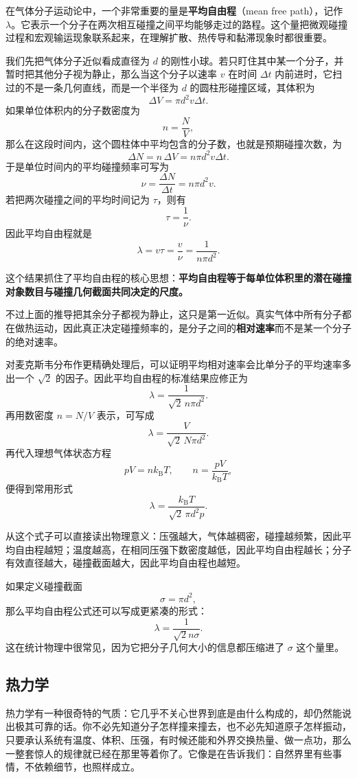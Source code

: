 \documentclass[UTF8]{ctexbook}
\begin{document}
在气体分子运动论中，一个非常重要的量是\textbf{平均自由程}（mean free path），记作 \(\lambda\)。它表示一个分子在两次相互碰撞之间平均能够走过的路程。这个量把微观碰撞过程和宏观输运现象联系起来，在理解扩散、热传导和黏滞现象时都很重要。


我们先把气体分子近似看成直径为 \(d\) 的刚性小球。若只盯住其中某一个分子，并暂时把其他分子视为静止，那么当这个分子以速率 \(v\) 在时间 \(\Delta t\) 内前进时，它扫过的不是一条几何直线，而是一个半径为 \(d\) 的圆柱形碰撞区域，其体积为
\[
\Delta V=\pi d^2 v\Delta t.
\]
如果单位体积内的分子数密度为
\[
n=\frac{N}{V},
\]
那么在这段时间内，这个圆柱体中平均包含的分子数，也就是预期碰撞次数，为
\[
\Delta N=n\,\Delta V=n\pi d^2 v\Delta t.
\]
于是单位时间内的平均碰撞频率可写为
\[
\nu=\frac{\Delta N}{\Delta t}=n\pi d^2 v.
\]
若把两次碰撞之间的平均时间记为 \(\tau\)，则有
\[
\tau=\frac{1}{\nu}.
\]
因此平均自由程就是
\[
\lambda=v\tau=\frac{v}{\nu}=\frac{1}{n\pi d^2}.
\]

这个结果抓住了平均自由程的核心思想：\textbf{平均自由程等于每单位体积里的潜在碰撞对象数目与碰撞几何截面共同决定的尺度。}



不过上面的推导把其余分子都视为静止，这只是第一近似。真实气体中所有分子都在做热运动，因此真正决定碰撞频率的，是分子之间的\textbf{相对速率}而不是某一个分子的绝对速率。

对麦克斯韦分布作更精确处理后，可以证明平均相对速率会比单分子的平均速率多出一个 \(\sqrt{2}\) 的因子。因此平均自由程的标准结果应修正为
\[
\lambda=\frac{1}{\sqrt{2}\,n\pi d^2}.
\]
再用数密度 \(n=N/V\) 表示，可写成
\[
\lambda=\frac{V}{\sqrt{2}\,N\pi d^2}.
\]
再代入理想气体状态方程
\[
pV=nk_{\mathrm B}T,
\qquad
n=\frac{pV}{k_{\mathrm B}T},
\]
便得到常用形式
\[
\lambda=\frac{k_{\mathrm B}T}{\sqrt{2}\,\pi d^2 p}.
\]

从这个式子可以直接读出物理意义：压强越大，气体越稠密，碰撞越频繁，因此平均自由程越短；温度越高，在相同压强下数密度越低，因此平均自由程越长；分子有效直径越大，碰撞截面越大，因此平均自由程也越短。



如果定义碰撞截面
\[
\sigma=\pi d^2,
\]
那么平均自由程公式还可以写成更紧凑的形式：
\[
\lambda=\frac{1}{\sqrt{2}n\sigma}.
\]
这在统计物理中很常见，因为它把分子几何大小的信息都压缩进了 \(\sigma\) 这个量里。


\subsection{热力学}

热力学有一种很奇特的气质：它几乎不关心世界到底是由什么构成的，却仍然能说出极其可靠的话。你不必先知道分子怎样撞来撞去，也不必先知道原子怎样振动，只要承认系统有温度、体积、压强，有时候还能和外界交换热量、做一点功，那么一整套惊人的规律就已经在那里等着你了。它像是在告诉我们：自然界里有些事情，不依赖细节，也照样成立。
\end{document}
